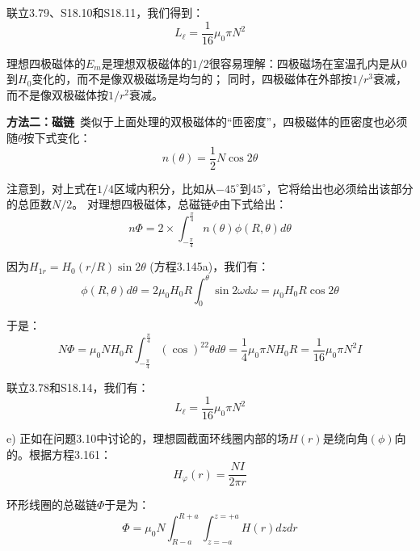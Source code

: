 联立3.79、S18.10和S18.11，我们得到：
 \begin{equation*}%
L_\ell=\frac{1}{16}\mu_0\pi N^2 \tag{3.88}
\end{equation*}

理想四极磁体的$E_m$是理想双极磁体的$1/2$很容易理解：四极磁场在室温孔内是从$0$到$H_0$变化的，而不是像双极磁场是均匀的；
同时，四极磁体在外部按$1/r^3$衰减，而不是像双极磁体按$1/r^2$衰减。

\textbf{方法二：磁链}\ 类似于上面处理的双极磁体的“匝密度”，四极磁体的匝密度也必须随$\theta$按下式变化：
 \begin{equation*}%
n(\theta)=\frac{1}{2}N\cos 2\theta \tag{S18.12}
\end{equation*}

注意到，对上式在$1/4$区域内积分，比如从$-45^\circ$到$45^\circ$，它将给出也必须给出该部分的总匝数$N/2$。
对理想四极磁体，总磁链$\Phi$由下式给出：
\begin{equation*}%
n\Phi=2\times\int_{-\frac{\pi}{4}}^{\frac{\pi}{4}}n(\theta)\phi(R,\theta)d\theta \tag{S18.13b}
\end{equation*}

因为$H_{1r} = H_0(r/R) \sin 2\theta$ (方程3.145a)，我们有：
 \begin{equation*}%
\phi(R,\theta)d\theta=2\mu_0H_0R\int_{0}^{\theta}\sin 2\omega d\omega=\mu_0H_0R\cos 2\theta\tag{18.13b}
\end{equation*}

于是：
\begin{equation*}%
N\Phi=\mu_0NH_0R\int_{-\frac{\pi}{4}}^{\frac{\pi}{4}}(\cos)^22\theta d\theta
=\frac{1}{4}\mu_0\pi NH_0R=\frac{1}{16}\mu_0\pi N^2I \tag{S18.4}
\end{equation*}

联立3.78和S18.14，我们有：
 \begin{equation*}%
L_\ell=\frac{1}{16}\mu_0\pi N^2 \tag{3.88}
\end{equation*}

e) 正如在问题3.10中讨论的，理想圆截面环线圈内部的场$H(r)$是绕向角$(\phi)$向的。根据方程3.161：
 \begin{equation*}%
H_\varphi(r)=\frac{NI}{2\pi r} \tag{S18.15}
\end{equation*}

环形线圈的总磁链$\Phi$于是为：
\begin{equation*}%
\Phi=\mu_0N\int_{R-a}^{R+a}\int_{z=-a}^{z=+a}H(r)dzdr \tag{S18.16}
\end{equation*}

